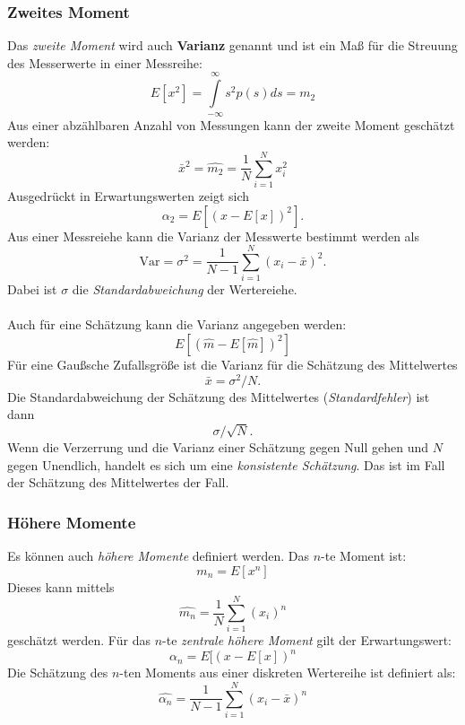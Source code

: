 \subsubsection*{Zweites Moment}
Das \textit{zweite Moment} wird auch \textbf{Varianz} genannt und ist ein Maß für die Streuung des Messerwerte in einer Messreihe:
\begin{equation}
E[x^2]= \int\limits_{-\infty}^{\infty} s^2 p(s) ds=m_2
\end{equation}
Aus einer abzählbaren Anzahl von Messungen kann der zweite Moment geschätzt werden:
\begin{equation}
\bar x^2 = \hat{m_2} = \frac{1}{N}\sum\limits_{i=1}^N x_i^2
\end{equation}
Ausgedrückt in Erwartungswerten zeigt sich
\[
\alpha_2 = E[(x-E[x])^2].
\]
Aus einer Messreiehe kann die Varianz der Messwerte bestimmt werden als
\begin{equation}
\mbox{Var} = \sigma^2=\frac{1}{N-1}\sum \limits_{i=1}^N (x_i - \bar x)^2.
\end{equation}
Dabei ist $\sigma$ die \textsl{Standardabweichung} der Wertereiehe.\\\\
Auch für eine Schätzung kann die Varianz angegeben werden:
\[
E[(\hat{m}-E[\hat{m}])^2]
\]
Für eine Gaußsche Zufallsgröße ist die Varianz für die Schätzung des Mittelwertes
\[
\bar x = \sigma^2/N.
\]
Die Standardabweichung der Schätzung des Mittelwertes (\textit{Standardfehler}) ist dann 
\[
\sigma/\sqrt{N}.
\]
Wenn die Verzerrung und die Varianz einer Schätzung gegen Null gehen und $N$ gegen Unendlich, handelt es sich um eine \textit{konsistente Schätzung}. Das ist im Fall der Schätzung des Mittelwertes der Fall.\\

\subsubsection*{Höhere Momente}
Es können auch \textit{höhere Momente} definiert werden. Das $n$-te Moment ist:
\[
m_n=E[x^n]
\]
Dieses kann mittels
\[
\hat{m_n}=\frac {1}{N} \sum\limits_{i=1}^N (x_i)^n
\]
geschätzt werden. 
Für das $n$-te \textit{zentrale höhere Moment} gilt der Erwartungswert:
\[
\alpha_n = E[(x-E[x])^n
\]
Die Schätzung des $n$-ten Moments aus einer diskreten Wertereihe ist definiert als:
\begin{equation}
\hat{\alpha_n}=\frac {1}{N-1} \sum_{i=1}^N (x_i - \bar x)^n
\end{equation}

